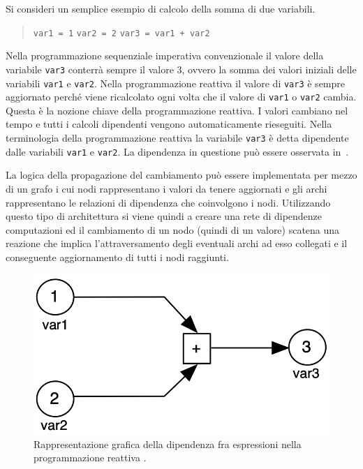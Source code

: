 \documentclass[12pt,a4paper,openright,twoside]{book}
\begin{document}
Si consideri un semplice esempio di calcolo della somma di due variabili.
\begin{quotation}\noindent
    \texttt{var1 = 1} \newline
    \texttt{var2 = 2} \newline
    \texttt{var3 = var1 + var2}
\end{quotation}
Nella programmazione sequenziale imperativa convenzionale il valore della variabile \texttt{var3} conterrà sempre il valore 3, ovvero la somma dei valori iniziali delle variabili \texttt{var1} e \texttt{var2}.
Nella programmazione reattiva il valore di \texttt{var3} è sempre aggiornato perché viene ricalcolato ogni volta che il valore di \texttt{var1} o \texttt{var2} cambia.
Questa è la nozione chiave della programmazione reattiva. I valori cambiano nel tempo e tutti i calcoli dipendenti vengono automaticamente rieseguiti. Nella terminologia della programmazione reattiva la variabile \texttt{var3} è detta dipendente dalle variabili \texttt{var1} e \texttt{var2}. La dipendenza in questione può essere osservata in~.

La logica della propagazione del cambiamento può essere implementata per mezzo di un grafo i cui nodi rappresentano i valori da tenere aggiornati e gli archi rappresentano le relazioni di dipendenza che coinvolgono i nodi. Utilizzando questo tipo di architettura si viene quindi a creare una rete di dipendenze computazioni ed il cambiamento di un nodo (quindi di un valore) scatena una reazione che implica l'attraversamento degli eventuali archi ad esso collegati e il conseguente aggiornamento di tutti i nodi raggiunti. 

\begin{figure}
    \centering
    \includegraphics[width=.65\linewidth]{figures/reactive-programming/RP-dependency.png}
    \caption{Rappresentazione grafica della dipendenza fra espressioni nella programmazione reattiva \cite{DBLP:journals/csur/BainomugishaCCMM13}.}
    \label{fig:rp-dependency}
\end{figure}
\end{document}
